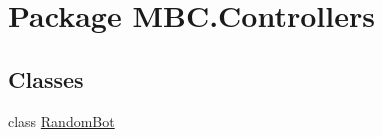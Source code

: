 \hypertarget{namespace_m_b_c_1_1_controllers}{\section{Package M\-B\-C.\-Controllers}
\label{namespace_m_b_c_1_1_controllers}
}
\subsection*{Classes}
\begin{DoxyCompactItemize}
\item 
class \hyperlink{class_m_b_c_1_1_controllers_1_1_random_bot}{Random\-Bot}
\end{DoxyCompactItemize}
